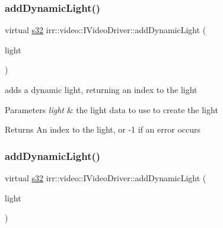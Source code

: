 \subsubsection{\texorpdfstring{add\+Dynamic\+Light()}{addDynamicLight()}\hspace{0.1cm}{\footnotesize\ttfamily [1/2]}}
{\footnotesize\ttfamily virtual \hyperlink{namespaceirr_ac66849b7a6ed16e30ebede579f9b47c6}{s32} irr\+::video\+::\+I\+Video\+Driver\+::add\+Dynamic\+Light (\begin{DoxyParamCaption}\item[{const \hyperlink{structirr_1_1video_1_1SLight}{S\+Light} \&}]{light }\end{DoxyParamCaption})\hspace{0.3cm}{\ttfamily [pure virtual]}}



adds a dynamic light, returning an index to the light 


\begin{DoxyParams}{Parameters}
{\em light} & the light data to use to create the light \\
\hline
\end{DoxyParams}
\begin{DoxyReturn}{Returns}
An index to the light, or -\/1 if an error occurs 
\end{DoxyReturn}
\mbox{\label{classirr_1_1video_1_1IVideoDriver_a813a39352eae26c4d30b5882618639be}} 
\subsubsection{\texorpdfstring{add\+Dynamic\+Light()}{addDynamicLight()}\hspace{0.1cm}{\footnotesize\ttfamily [2/2]}}
{\footnotesize\ttfamily virtual \hyperlink{namespaceirr_ac66849b7a6ed16e30ebede579f9b47c6}{s32} irr\+::video\+::\+I\+Video\+Driver\+::add\+Dynamic\+Light (\begin{DoxyParamCaption}\item[{const \hyperlink{structirr_1_1video_1_1SLight}{S\+Light} \&}]{light }\end{DoxyParamCaption})\hspace{0.3cm}{\ttfamily [pure virtual]}}



